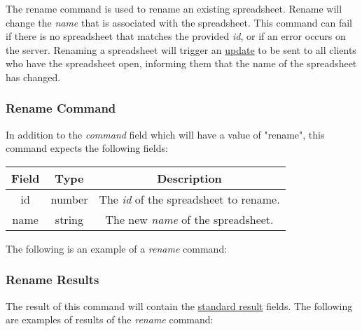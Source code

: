 The rename command is used to rename an existing spreadsheet. Rename will 
change the \emph{name} that is associated with the spreadsheet. This command 
can fail if there is no spreadsheet that matches the provided \emph{id}, or 
if an error occurs on the server. Renaming a spreadsheet will trigger an 
\hyperref[lst:update:rename]{update} to be sent to all clients who have the 
spreadsheet open, informing them that the name of the spreadsheet has changed.

\subsubsection{Rename Command}
In addition to the \emph{command} field which will have a value of "rename", this command expects the following fields:

\begin{table}[H]
    \begin{center}
        \begin{tabular}{|c|c|c|}\hline
            Field & Type & Description \\\hline
            id & number & The \emph{id} of the spreadsheet to rename. \\\hline
            name & string & The new \emph{name} of the spreadsheet. \\\hline
        \end{tabular}
    \end{center}
\end{table}

The following is an example of a \emph{rename} command:


\subsubsection{Rename Results}
The result of this command will contain the \hyperref[sec:message:result]{standard result} fields.
The following are examples of results of the \emph{rename} command:





